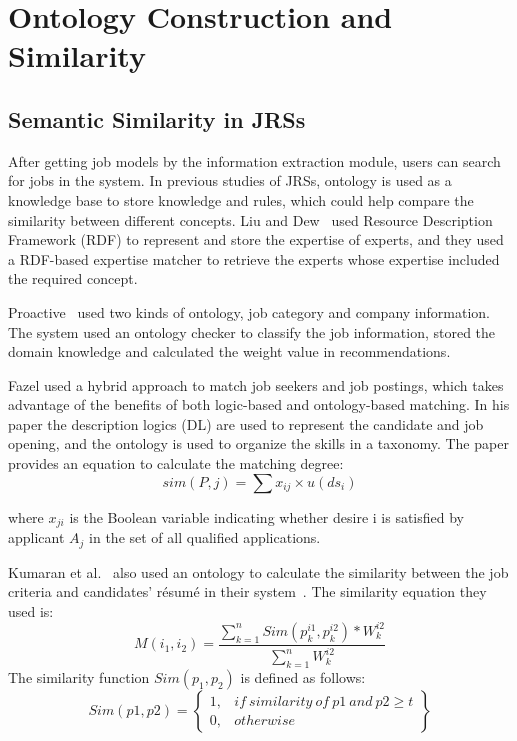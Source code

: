 \section{Ontology Construction and Similarity}
\label{sec1}

\subsection{Semantic Similarity in JRSs}
After getting job models by the information extraction module, users can search for jobs in the system. In previous studies of JRSs, ontology is used as a knowledge base to store knowledge and rules, which could help compare the similarity between different concepts. Liu and Dew~\cite{liu2004using} used Resource Description Framework (RDF) to represent and store the expertise of experts, and they used a RDF-based expertise matcher to retrieve the experts whose expertise included the required concept.

Proactive~\cite{lee2007fighting} used two kinds of ontology, job category and company information. The system used an ontology checker to classify the job information, stored the domain knowledge and calculated the weight value in recommendations.

Fazel \cite{fazel2009semantic} used a hybrid approach to match job seekers and job postings, which takes advantage of the benefits of both logic-based and ontology-based matching. In his paper the description logics (DL) are used to represent the candidate and job opening, and the ontology is used to organize the skills in a taxonomy. The paper provides an equation to calculate the matching degree:
$$ sim\left(P ,j \right) = \sum x_{ij} \times u(ds_i) $$

where $x_{ji}$ is the Boolean variable indicating whether desire i is satisfied by applicant $A_{j}$ in the set of all qualified applications.

Kumaran et al.~\cite{kumaran2013towards} also used an ontology to calculate the similarity between the job criteria and candidates' r\'esum\'e in their system~\cite{kumaran2013towards}. The similarity equation they used is:
$$ M\left ( i_1, i_2 \right ) = \frac{\sum_{k=1}^{n} Sim\left (p_{k}^{i1},  p_{k}^{i2} \right ) * W_{k}^{i2}}{\sum_{k=1}^{n} W_{k}^{i2}}  $$
The similarity function $Sim(p_1, p_2)$ is defined as follows:
$$ Sim(p1, p2) = \begin{Bmatrix}
1, & if~similarity~of~p1~and~p2 \geqslant t\\
0, & otherwise
\end{Bmatrix} $$

